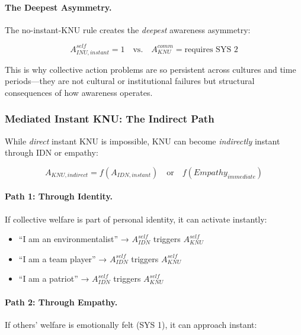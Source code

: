 \paragraph{The Deepest Asymmetry.}
The no-instant-KNU rule creates the \emph{deepest} awareness asymmetry:

\begin{equation}
A^{self}_{INU,instant} = 1 \quad \text{vs.} \quad A^{comm}_{KNU} = \text{requires SYS 2}
\end{equation}

This is why collective action problems are so persistent across cultures
and time periods---they are not cultural or institutional failures but
structural consequences of how awareness operates.

\subsubsection{Mediated Instant KNU: The Indirect Path}

While \emph{direct} instant KNU is impossible, KNU can become 
\emph{indirectly} instant through IDN or empathy:

\begin{equation}
A_{KNU,indirect} = f(A_{IDN,instant}) \quad \text{or} \quad f(Empathy_{immediate})
\end{equation}

\paragraph{Path 1: Through Identity.}
If collective welfare is part of personal identity, it can activate instantly:

\begin{itemize}
\item ``I am an environmentalist'' → $A^{self}_{IDN}$ triggers $A^{self}_{KNU}$
\item ``I am a team player'' → $A^{self}_{IDN}$ triggers $A^{self}_{KNU}$
\item ``I am a patriot'' → $A^{self}_{IDN}$ triggers $A^{self}_{KNU}$
\end{itemize}

\paragraph{Path 2: Through Empathy.}
If others' welfare is emotionally felt (SYS 1), it can approach instant:

